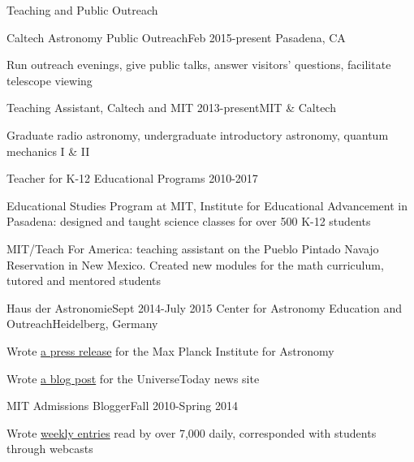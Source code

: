 \documentclass{resume} %
\begin{document}
\begin{rSection}{Teaching and Public Outreach}

  \begin{rSubsection}{Caltech Astronomy Public Outreach}{Feb 2015-present}
    {}{Pasadena, CA}
  \item Run outreach evenings, give public talks, answer visitors' questions,
    facilitate telescope viewing
  \end{rSubsection}

  \begin{rSubsection}{Teaching Assistant, Caltech and MIT} 
    {2013-present}{}{MIT \& Caltech}
  \item Graduate radio astronomy, undergraduate introductory astronomy,
    quantum mechanics I \& II
  \end{rSubsection}

  \begin{rSubsection}{Teacher for K-12 Educational Programs}
    {2010-2017}{}{}
  \item Educational Studies Program at MIT,
    Institute for Educational Advancement in Pasadena:
    designed and taught science
    classes for over 500 K-12 students
  \item MIT/Teach For America:
    teaching assistant on
    the Pueblo Pintado Navajo Reservation in New Mexico. 
    Created new modules for the math curriculum, 
    tutored and mentored students
  \end{rSubsection}

  \begin{rSubsection}
    {Haus der Astronomie}{Sept 2014-July 2015}
    {Center for Astronomy Education and Outreach}{Heidelberg, Germany}
  \item Wrote \href{http://www.mpia.de/news/science/2015-03-biosignatures}
    {a press release} for the Max Planck Institute for Astronomy
  \item Wrote \href{http://www.universetoday.com/120820/distant-stellar-nurseries-this-time-in-high-definition/}
    {a blog post} for the UniverseToday news site
  \end{rSubsection}

  \begin{rSubsection}{MIT Admissions Blogger}{Fall 2010-Spring 2014}
    {}{}
  \item Wrote \href{http://mitadmissions.org/blogs/profile/annayq}{weekly entries} read by over 7,000 daily, corresponded with students through webcasts
  \end{rSubsection}


\end{rSection}
\end{document}

